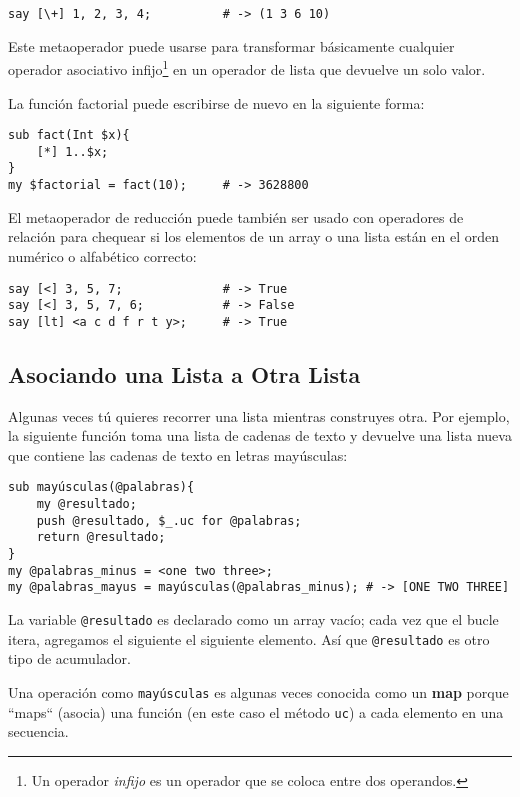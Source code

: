 \begin{verbatim}
say [\+] 1, 2, 3, 4;          # -> (1 3 6 10)
\end{verbatim}

Este metaoperador puede usarse para transformar básicamente
cualquier operador asociativo infijo\footnote{Un operador 
\emph{infijo} es un operador que se coloca
entre dos operandos.} en un operador de lista 
que devuelve un solo valor.


La función factorial puede escribirse de nuevo
en la siguiente forma:

\begin{verbatim}
sub fact(Int $x){
    [*] 1..$x; 
}
my $factorial = fact(10);     # -> 3628800
\end{verbatim}

El metaoperador de reducción puede también ser usado con
operadores de relación para chequear si los elementos de
un array o una lista están en el orden numérico o alfabético
correcto:

\begin{verbatim}
say [<] 3, 5, 7;              # -> True
say [<] 3, 5, 7, 6;           # -> False
say [lt] <a c d f r t y>;     # -> True
\end{verbatim}

\subsection{Asociando una Lista a Otra Lista}

Algunas veces tú quieres recorrer una lista mientras 
construyes otra. Por ejemplo, la siguiente función toma una
lista de cadenas de texto y devuelve una lista nueva que 
contiene las cadenas de texto en letras mayúsculas:

\begin{verbatim}
sub mayúsculas(@palabras){
    my @resultado;
    push @resultado, $_.uc for @palabras;
    return @resultado;
}
my @palabras_minus = <one two three>;
my @palabras_mayus = mayúsculas(@palabras_minus); # -> [ONE TWO THREE]
\end{verbatim}
%
La variable \verb|@resultado| es declarado como un array vacío;
cada vez que el bucle itera, agregamos el siguiente el 
siguiente elemento. Así que \verb|@resultado| es otro tipo de
acumulador.

Una operación como \verb|mayúsculas| es algunas veces conocida
como un {\bf map} porque ``maps`` (asocia) una función (en este
caso el método {\tt uc}) a cada elemento en una secuencia.


